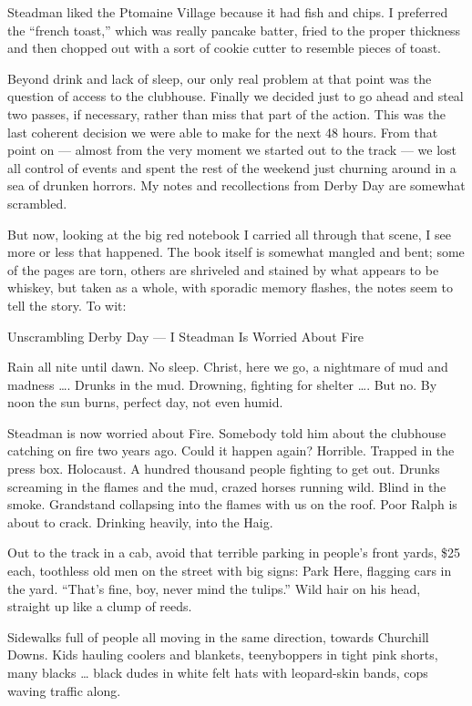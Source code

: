 \documentclass[10pt,a4paper]{article}
\begin{document}
Steadman liked the Ptomaine Village because it had fish and chips. I preferred the “french toast,” which was really pancake batter, fried to the proper thickness and then chopped out with a sort of cookie cutter to resemble pieces of toast.

Beyond drink and lack of sleep, our only real problem at that point was the question of access to the clubhouse. Finally we decided just to go ahead and steal two passes, if necessary, rather than miss that part of the action. This was the last coherent decision we were able to make for the next 48 hours. From that point on — almost from the very moment we started out to the track — we lost all control of events and spent the rest of the weekend just churning around in a sea of drunken horrors. My notes and recollections from Derby Day are somewhat scrambled.

But now, looking at the big red notebook I carried all through that scene, I see more or less that happened. The book itself is somewhat mangled and bent; some of the pages are torn, others are shriveled and stained by what appears to be whiskey, but taken as a whole, with sporadic memory flashes, the notes seem to tell the story. To wit:

Unscrambling Derby Day — I
Steadman Is Worried About Fire

Rain all nite until dawn. No sleep. Christ, here we go, a nightmare of mud and madness …. Drunks in the mud. Drowning, fighting for shelter …. But no. By noon the sun burns, perfect day, not even humid.

Steadman is now worried about Fire. Somebody told him about the clubhouse catching on fire two years ago. Could it happen again? Horrible. Trapped in the press box. Holocaust. A hundred thousand people fighting to get out. Drunks screaming in the flames and the mud, crazed horses running wild. Blind in the smoke. Grandstand collapsing into the flames with us on the roof. Poor Ralph is about to crack. Drinking heavily, into the Haig.

Out to the track in a cab, avoid that terrible parking in people’s front yards, \$25 each, toothless old men on the street with big signs: Park Here, flagging cars in the yard. “That’s fine, boy, never mind the tulips.” Wild hair on his head, straight up like a clump of reeds.

Sidewalks full of people all moving in the same direction, towards Churchill Downs. Kids hauling coolers and blankets, teenyboppers in tight pink shorts, many blacks … black dudes in white felt hats with leopard-skin bands, cops waving traffic along.
\end{document}
